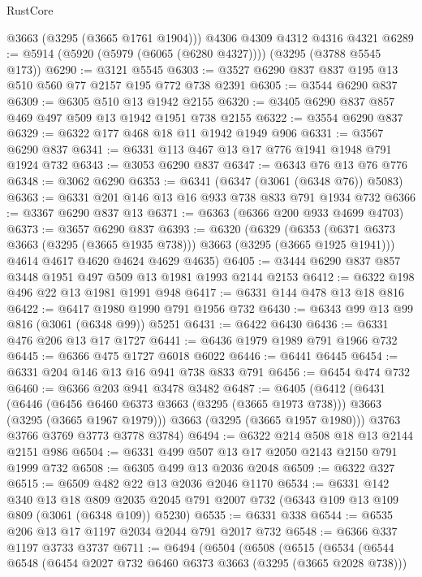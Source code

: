 \begin{lexlean}{RustCore}
\begin{coremodule}
      @3663
      (@3295 (@3665 @1761 @1904)))
    @4306
    @4309
    @4312
    @4316
    @4321
@6289 := @5914 (@5920 (@5979 (@6065 (@6280 @4327)))) (@3295 (@3788 @5545 @173))
@6290 := @3121 @5545
@6303 := @3527 @6290 @837 @837 @195 @13 @510 @560 @77 @2157 @195 @772 @738 @2391
@6305 := @3544 @6290 @837
@6309 := @6305 @510 @13 @1942 @2155
@6320 := @3405 @6290 @837 @857 @469 @497 @509 @13 @1942 @1951 @738 @2155
@6322 := @3554 @6290 @837
@6329 := @6322 @177 @468 @18 @11 @1942 @1949 @906
@6331 := @3567 @6290 @837
@6341 := @6331 @113 @467 @13 @17 @776 @1941 @1948 @791 @1924 @732
@6343 := @3053 @6290 @837
@6347 := @6343 @76 @13 @76 @776
@6348 := @3062 @6290
@6353 := @6341 (@6347 (@3061 (@6348 @76)) @5083)
@6363 := @6331 @201 @146 @13 @16 @933 @738 @833 @791 @1934 @732
@6366 := @3367 @6290 @837 @13
@6371 := @6363 (@6366 @200 @933 @4699 @4703)
@6373 := @3657 @6290 @837
@6393 := @6320
    (@6329
      (@6353 (@6371 @6373 @3663 (@3295 (@3665 @1935 @738))) @3663 (@3295 (@3665 @1925 @1941)))
      @4614
      @4617
      @4620
      @4624
      @4629
      @4635)
@6405 := @3444 @6290 @837 @857 @3448 @1951 @497 @509 @13 @1981 @1993 @2144 @2153
@6412 := @6322 @198 @496 @22 @13 @1981 @1991 @948
@6417 := @6331 @144 @478 @13 @18 @816
@6422 := @6417 @1980 @1990 @791 @1956 @732
@6430 := @6343 @99 @13 @99 @816 (@3061 (@6348 @99)) @5251
@6431 := @6422 @6430
@6436 := @6331 @476 @206 @13 @17 @1727
@6441 := @6436 @1979 @1989 @791 @1966 @732
@6445 := @6366 @475 @1727 @6018 @6022
@6446 := @6441 @6445
@6454 := @6331 @204 @146 @13 @16 @941 @738 @833 @791
@6456 := @6454 @474 @732
@6460 := @6366 @203 @941 @3478 @3482
@6487 := @6405
    (@6412
      (@6431
        (@6446
          (@6456 @6460 @6373 @3663 (@3295 (@3665 @1973 @738)))
          @3663
          (@3295 (@3665 @1967 @1979)))
        @3663
        (@3295 (@3665 @1957 @1980)))
      @3763
      @3766
      @3769
      @3773
      @3778
      @3784)
@6494 := @6322 @214 @508 @18 @13 @2144 @2151 @986
@6504 := @6331 @499 @507 @13 @17 @2050 @2143 @2150 @791 @1999 @732
@6508 := @6305 @499 @13 @2036 @2048
@6509 := @6322 @327
@6515 := @6509 @482 @22 @13 @2036 @2046 @1170
@6534 := @6331
    @142
    @340
    @13
    @18
    @809
    @2035
    @2045
    @791
    @2007
    @732
    (@6343 @109 @13 @109 @809 (@3061 (@6348 @109)) @5230)
@6535 := @6331 @338
@6544 := @6535 @206 @13 @17 @1197 @2034 @2044 @791 @2017 @732
@6548 := @6366 @337 @1197 @3733 @3737
@6711 := @6494
    (@6504
      (@6508
        (@6515
          (@6534
            (@6544
              @6548
              (@6454 @2027 @732 @6460 @6373 @3663 (@3295 (@3665 @2028 @738)))

\end{coremodule}
\end{lexlean}
